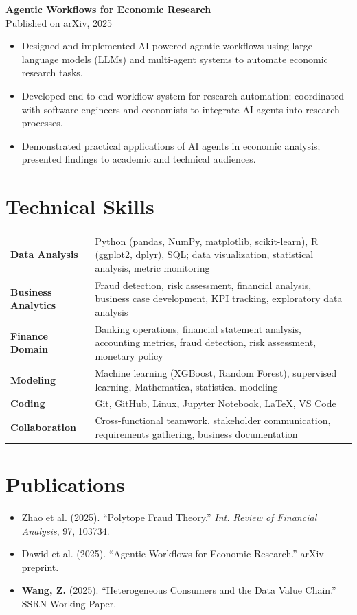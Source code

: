 \documentclass[a4paper,11pt]{article}
\newcommand{\project}[2]{%
  \textbf{#1}\\[-1pt]
  \textcolor{muted}{\small #2}\par
}
\begin{document}
\project{Agentic Workflows for Economic Research}{Published on arXiv, 2025}
\begin{itemize}
  \item Designed and implemented AI-powered agentic workflows using large language models (LLMs) and multi-agent systems to automate economic research tasks.
  \item Developed end-to-end workflow system for research automation; coordinated with software engineers and economists to integrate AI agents into research processes.
  \item Demonstrated practical applications of AI agents in economic analysis; presented findings to academic and technical audiences.
\end{itemize}

\section{Technical Skills}
\begin{tabularx}{\linewidth}{@{}>{\bfseries}p{3.2cm}X@{}}
Data Analysis & Python (pandas, NumPy, matplotlib, scikit-learn), R (ggplot2, dplyr), SQL; data visualization, statistical analysis, metric monitoring\\
Business Analytics & Fraud detection, risk assessment, financial analysis, business case development, KPI tracking, exploratory data analysis\\
Finance Domain & Banking operations, financial statement analysis, accounting metrics, fraud detection, risk assessment, monetary policy\\
Modeling & Machine learning (XGBoost, Random Forest), supervised learning, Mathematica, statistical modeling\\
Coding & Git, GitHub, Linux, Jupyter Notebook, LaTeX, VS Code\\
Collaboration & Cross-functional teamwork, stakeholder communication, requirements gathering, business documentation\\
\end{tabularx}

\section{Publications}
\begin{itemize}
  \item Zhao et al. (2025). ``Polytope Fraud Theory.'' \textit{Int. Review of Financial Analysis}, 97, 103734.
  \item Dawid et al. (2025). ``Agentic Workflows for Economic Research.'' arXiv preprint.
  \item \textbf{Wang, Z.} (2025). ``Heterogeneous Consumers and the Data Value Chain.'' SSRN Working Paper.
\end{itemize}
\end{document}
